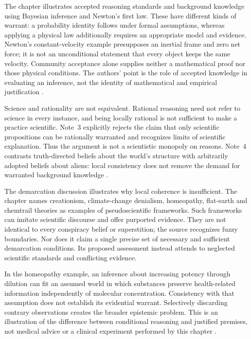 The chapter illustrates accepted reasoning standards and background
knowledge using Bayesian inference and Newton's first law. These have
different kinds of warrant: a probability identity follows under formal
assumptions, whereas applying a physical law additionally requires an
appropriate model and evidence. Newton's constant-velocity example
presupposes an inertial frame and zero net force; it is not an unconditional
statement that every object keeps the same velocity. Community acceptance
alone supplies neither a mathematical proof nor those physical conditions.
The authors' point is the role of accepted knowledge in evaluating an
inference, not the identity of mathematical and empirical justification
\cite[pp.~767--768]{BrommeGierth2021PublicScience}.

Science and rationality are not equivalent. Rational reasoning need not
refer to science in every instance, and being locally rational is not
sufficient to make a practice scientific. Note~3 explicitly rejects the
claim that only scientific propositions can be rationally warranted and
recognizes limits of scientific explanation. Thus the argument is not a
scientistic monopoly on reasons. Note~4 contrasts truth-directed beliefs
about the world's structure with arbitrarily adopted beliefs about aliens:
local consistency does not remove the demand for warranted background
knowledge \cite[pp.~767, 773, notes~3--4]{BrommeGierth2021PublicScience}.

The demarcation discussion illustrates why local coherence is insufficient.
The chapter names creationism, climate-change denialism, homeopathy,
flat-earth and chemtrail theories as examples of pseudoscientific frameworks.
Such frameworks can imitate scientific discourse and offer purported
evidence. They are not identical to every conspiracy belief or superstition;
the source recognizes fuzzy boundaries. Nor does it claim a single precise
set of necessary and sufficient demarcation conditions. Its proposed
assessment instead attends to neglected scientific standards and conflicting
evidence.

In the homeopathy example, an inference about increasing potency through
dilution can fit an assumed world in which substances preserve health-related
information independently of molecular concentration. Consistency with
that assumption does not establish its evidential warrant. Selectively
discarding contrary observations creates the broader epistemic problem.
This is an illustration of the difference between conditional reasoning
and justified premises, not medical advice or a clinical experiment
performed by this chapter \cite[p.~767]{BrommeGierth2021PublicScience}.

